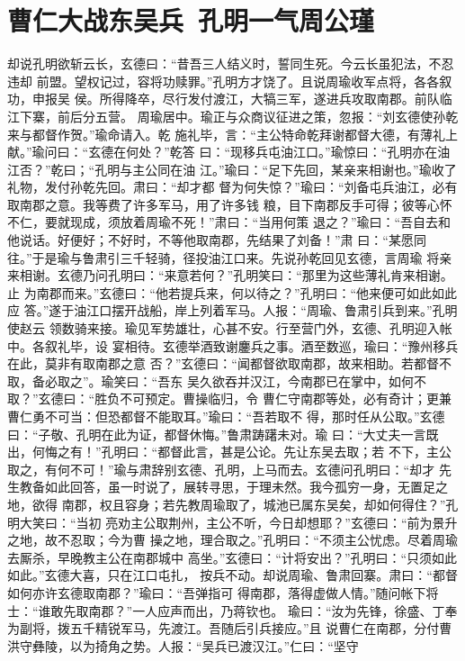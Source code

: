 \chapter{曹仁大战东吴兵~孔明一气周公瑾}

却说孔明欲斩云长，玄德曰：“昔吾三人结义时，誓同生死。今云长虽犯法，不忍违却
前盟。望权记过，容将功赎罪。”孔明方才饶了。且说周瑜收军点将，各各叙功，申报吴
侯。所得降卒，尽行发付渡江，大犒三军，遂进兵攻取南郡。前队临江下寨，前后分五营。
周瑜居中。瑜正与众商议征进之策，忽报：“刘玄德使孙乾来与都督作贺。”瑜命请入。乾
施礼毕，言：“主公特命乾拜谢都督大德，有薄礼上献。”瑜问曰：“玄德在何处？”乾答
曰：“现移兵屯油江口。”瑜惊曰：“孔明亦在油江否？”乾曰；“孔明与主公同在油
江。”瑜曰：“足下先回，某亲来相谢也。”瑜收了礼物，发付孙乾先回。肃曰：“却才都
督为何失惊？”瑜曰：“刘备屯兵油江，必有取南郡之意。我等费了许多军马，用了许多钱
粮，目下南郡反手可得；彼等心怀不仁，要就现成，须放着周瑜不死！”肃曰：“当用何策
退之？”瑜曰：“吾自去和他说话。好便好；不好时，不等他取南郡，先结果了刘备！”肃
曰：“某愿同往。”于是瑜与鲁肃引三千轻骑，径投油江口来。先说孙乾回见玄德，言周瑜
将亲来相谢。玄德乃问孔明曰：“来意若何？”孔明笑曰：“那里为这些薄礼肯来相谢。止
为南郡而来。”玄德曰：“他若提兵来，何以待之？”孔明曰：“他来便可如此如此应
答。”遂于油江口摆开战船，岸上列着军马。人报：“周瑜、鲁肃引兵到来。”孔明使赵云
领数骑来接。瑜见军势雄壮，心甚不安。行至营门外，玄德、孔明迎入帐中。各叙礼毕，设
宴相待。玄德举酒致谢鏖兵之事。酒至数巡，瑜曰：“豫州移兵在此，莫非有取南郡之意
否？”玄德曰：“闻都督欲取南郡，故来相助。若都督不取，备必取之”。瑜笑曰：“吾东
吴久欲吞并汉江，今南郡已在掌中，如何不取？”玄德曰：“胜负不可预定。曹操临归，令
曹仁守南郡等处，必有奇计；更兼曹仁勇不可当：但恐都督不能取耳。”瑜曰：“吾若取不
得，那时任从公取。”玄德曰：“子敬、孔明在此为证，都督休悔。”鲁肃踌躇未对。瑜
曰：“大丈夫一言既出，何悔之有！”孔明曰：“都督此言，甚是公论。先让东吴去取；若
不下，主公取之，有何不可！”瑜与肃辞别玄德、孔明，上马而去。玄德问孔明曰：“却才
先生教备如此回答，虽一时说了，展转寻思，于理未然。我今孤穷一身，无置足之地，欲得
南郡，权且容身；若先教周瑜取了，城池已属东吴矣，却如何得住？”孔明大笑曰：“当初
亮劝主公取荆州，主公不听，今日却想耶？”玄德曰：“前为景升之地，故不忍取；今为曹
操之地，理合取之。”孔明曰：“不须主公忧虑。尽着周瑜去厮杀，早晚教主公在南郡城中
高坐。”玄德曰：“计将安出？”孔明曰：“只须如此如此。”玄德大喜，只在江口屯扎，
按兵不动。却说周瑜、鲁肃回寨。肃曰：“都督如何亦许玄德取南郡？”瑜曰：“吾弹指可
得南郡，落得虚做人情。”随问帐下将士：“谁敢先取南郡？”一人应声而出，乃蒋钦也。
瑜曰：“汝为先锋，徐盛、丁奉为副将，拨五千精锐军马，先渡江。吾随后引兵接应。”且
说曹仁在南郡，分付曹洪守彝陵，以为掎角之势。人报：“吴兵已渡汉江。”仁曰：“坚守
